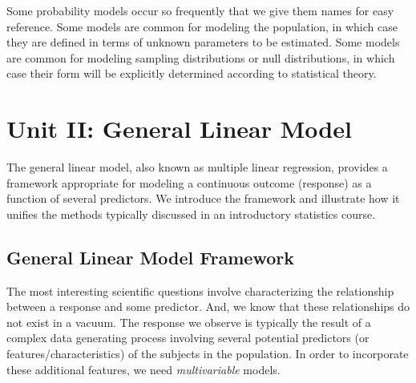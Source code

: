 \documentclass[
  letterpaper,
  DIV=11,
  numbers=noendperiod]{scrreprt}
\theoremstyle{definition}
\theoremstyle{definition}
\theoremstyle{remark}
\begin{document}
\begin{tcolorbox}[enhanced jigsaw, left=2mm, toprule=.15mm, arc=.35mm, breakable, opacitybacktitle=0.6, opacityback=0, rightrule=.15mm, colbacktitle=quarto-callout-tip-color!10!white, coltitle=black, leftrule=.75mm, toptitle=1mm, colframe=quarto-callout-tip-color-frame, titlerule=0mm, title=\textcolor{quarto-callout-tip-color}{\faLightbulb}\hspace{0.5em}{Big Idea}, bottomrule=.15mm, colback=white, bottomtitle=1mm]

Some probability models occur so frequently that we give them names for
easy reference. Some models are common for modeling the population, in
which case they are defined in terms of unknown parameters to be
estimated. Some models are common for modeling sampling distributions or
null distributions, in which case their form will be explicitly
determined according to statistical theory.

\end{tcolorbox}

\part{Unit II: General Linear Model}

The general linear model, also known as multiple linear regression,
provides a framework appropriate for modeling a continuous outcome
(response) as a function of several predictors. We introduce the
framework and illustrate how it unifies the methods typically discussed
in an introductory statistics course.

\hypertarget{sec-glm-model-framework}{%
\chapter{General Linear Model Framework}\label{sec-glm-model-framework}}

\providecommand{\norm}[1]{\left\lVert#1\right\rVert}
\providecommand{\abs}[1]{\left\lvert#1\right\rvert}
\providecommand{\dist}[1]{\stackrel{\text{#1}}{\sim}}
\providecommand{\ind}[1]{\mathbb{I}\left(#1\right)}
\providecommand{\bm}[1]{\mathbf{#1}}
\providecommand{\bs}[1]{\boldsymbol{#1}}
\providecommand{\Ell}{\mathcal{L}}
\providecommand{\indep}{\perp\negthickspace\negmedspace\perp}

The most interesting scientific questions involve characterizing the
relationship between a response and some predictor. And, we know that
these relationships do not exist in a vacuum. The response we observe is
typically the result of a complex data generating process involving
several potential predictors (or features/characteristics) of the
subjects in the population. In order to incorporate these additional
features, we need \emph{multivariable} models.
\end{document}
